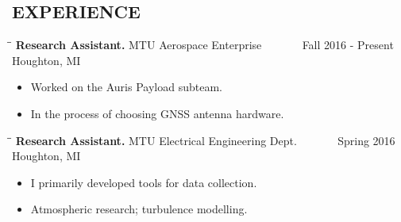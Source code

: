 \documentclass[letterpaper]{res}
\begin{document}
\begin{resume}

\section{EXPERIENCE}
   \vspace{-0.15in}
   \begin{tabbing}
   \hspace{2.3in}\= \hspace{2.6in}\= \kill %
   {\bf Research Assistant.} \>MTU Aerospace Enterprise \> ~~~~~~ Fall 2016 - Present\\
                          \>Houghton, MI
   \end{tabbing}\vspace{-10pt}
   \begin{itemize} \itemsep1pt \parskip0pt 
   \item Worked on the Auris Payload subteam.
   \item In the process of choosing GNSS antenna hardware.
   \end{itemize}

   \vspace{-0.15in}
   \begin{tabbing}
   \hspace{2.3in}\= \hspace{2.6in}\= \kill %
   {\bf Research Assistant.} \>MTU Electrical Engineering Dept. \> ~~~~~~ Spring 2016\\
                          \>Houghton, MI
   \end{tabbing}\vspace{-10pt}
   \begin{itemize} \itemsep1pt \parskip0pt 
   \item I primarily developed tools for data collection.
   \item Atmospheric research; turbulence modelling.
   \end{itemize}


\end{resume}
\end{document}
